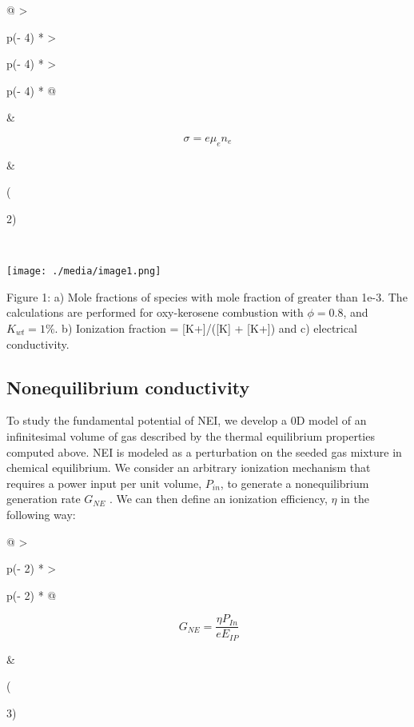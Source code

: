 \begin{longtable}[]{@{}
  >{\raggedright\arraybackslash}p{(\columnwidth - 4\tabcolsep) * }
  >{\raggedright\arraybackslash}p{(\columnwidth - 4\tabcolsep) * }
  >{\raggedright\arraybackslash}p{(\columnwidth - 4\tabcolsep) * }@{}}
\toprule
\begin{minipage}[b]{\linewidth}\raggedright
\end{minipage} & \begin{minipage}[b]{\linewidth}\raggedright
\[\sigma = e\mu_{e}n_{e}\]
\end{minipage} & \begin{minipage}[b]{\linewidth}\raggedright
(

2)
\end{minipage} \\
\midrule
\endhead
\bottomrule
\end{longtable}

\texttt{[image: ./media/image1.png]}

Figure 1: a) Mole fractions of species with mole fraction of greater than 1e-3. The calculations are performed for oxy-kerosene combustion with \(\phi = 0.8\), and \(K_{wt} = 1\%\). b) Ionization fraction = {[}K+{]}/({[}K{]} + {[}K+{]}) and c) electrical conductivity.

\hypertarget{nonequilibrium-conductivity}{%
\subsection{Nonequilibrium conductivity}\label{nonequilibrium-conductivity}}

To study the fundamental potential of NEI, we develop a 0D model of an infinitesimal volume of gas described by the thermal equilibrium properties computed above. NEI is modeled as a perturbation on the seeded gas mixture in chemical equilibrium. We consider an arbitrary ionization mechanism that requires a power input per unit volume, \(P_{in}\), to generate a nonequilibrium generation rate \(G_{NE}\) . We can then define an ionization efficiency, \(\eta\) in the following way:

\begin{longtable}[]{@{}
  >{\raggedright\arraybackslash}p{(\columnwidth - 2\tabcolsep) * }
  >{\raggedright\arraybackslash}p{(\columnwidth - 2\tabcolsep) * }@{}}
\toprule
\begin{minipage}[b]{\linewidth}\raggedright
\[{\ G}_{NE} = \frac{\eta P_{In}}{eE_{IP}}\]
\end{minipage} & \begin{minipage}[b]{\linewidth}\raggedright
(

3)
\end{minipage} \\
\midrule
\endhead
\bottomrule
\end{longtable}

